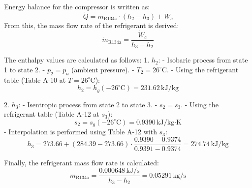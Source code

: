 Energy balance for the compressor is written as:  
\[
\dot{Q} = \dot{m}_{\text{R134a}} \cdot (h_2 - h_3) + \dot{W}_c
\]  
From this, the mass flow rate of the refrigerant is derived:  
\[
\dot{m}_{\text{R134a}} = \frac{\dot{W}_c}{h_3 - h_2}
\]  

The enthalpy values are calculated as follows:  
1. \( h_2 \):  
   - Isobaric process from state 1 to state 2.  
   - \( p_2 = p_a \) (ambient pressure).  
   - \( T_2 = 26^\circ\text{C} \).  
   - Using the refrigerant table (Table A-10 at \( T = 26^\circ\text{C} \)):  
     \[
     h_2 = h_g(-26^\circ\text{C}) = 231.62 \, \text{kJ/kg}
     \]  

2. \( h_3 \):  
   - Isentropic process from state 2 to state 3.  
   - \( s_2 = s_3 \).  
   - Using the refrigerant table (Table A-12 at \( s_3 \)):  
     \[
     s_2 = s_g(-26^\circ\text{C}) = 0.9390 \, \text{kJ/kg·K}
     \]  
   - Interpolation is performed using Table A-12 with \( s_3 \):  
     \[
     h_3 = 273.66 + (284.39 - 273.66) \cdot \frac{0.9390 - 0.9374}{0.9391 - 0.9374} = 274.74 \, \text{kJ/kg}
     \]  

Finally, the refrigerant mass flow rate is calculated:  
\[
\dot{m}_{\text{R134a}} = \frac{0.000648 \, \text{kJ/s}}{h_3 - h_2} = 0.05291 \, \text{kg/s}
\]